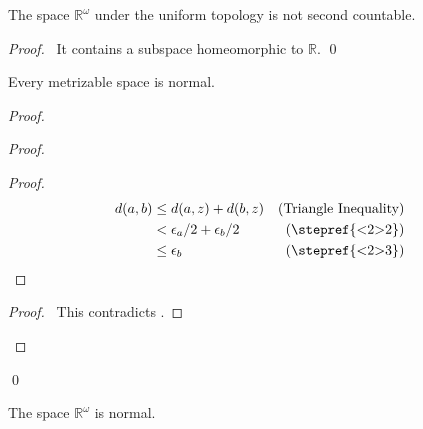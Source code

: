 \begin{prop}
  The space $\mathbb{R}^\omega$ under the uniform topology is not second
  countable.
\end{prop}

\begin{proof}
  \pf\ It contains a subspace homeomorphic to $\mathbb{R}$. \qed
\end{proof}

\begin{thm}[AC]
  \label{thm:topology:metric:normal}
  Every metrizable space is normal.
\end{thm}

\begin{proof}
  \pf
  \begin{proof}
    \begin{proof}
      \pf
      \begin{align*}
        d(a, b) & \leq d(a, z) + d(b, z) & (\text{Triangle Inequality}) \\
        & < \epsilon_a / 2 + \epsilon_b / 2 & (\text{\stepref{<2>2}}) \\
        & \leq \epsilon_b & (\text{\stepref{<2>3}})
      \end{align*}
    \end{proof}
    \qedstep
    \begin{proof}
      \pf\ This contradicts .
    \end{proof}
  \end{proof}
  \qed
\end{proof}

\begin{cor}
  The space $\mathbb{R}^\omega$ is normal.
\end{cor}

